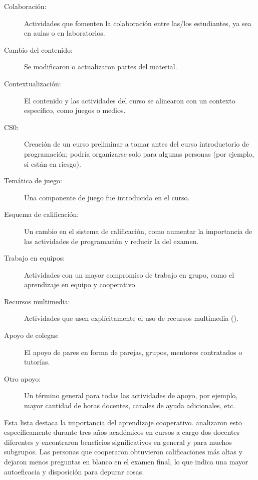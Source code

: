 \begin{description}

\item[Colaboración:]
  Actividades que fomenten la colaboración entre las/los estudiantes, ya sea en aulas o en laboratorios.

\item[Cambio del contenido:]
  Se modificaron o actualizaron partes del material.

\item[Contextualización:]
  El contenido y las actividades del curso se alinearon con un contexto específico, como juegos o medios.

\item[CS0:]
  Creación de un curso preliminar a tomar antes del curso introductorio de programación;
  podría organizarse solo para algunas personas (por ejemplo, si están en riesgo).

\item[Temática de juego:]
  Una componente de juego fue introducida en el curso.

\item[Esquema de calificación:]
  Un cambio en el sistema de calificación,
  como aumentar la importancia de las actividades de programación y reducir la del examen.

\item[Trabajo en equipos:]
  Actividades con un mayor compromiso de trabajo en grupo, como el aprendizaje en equipo y cooperativo.

\item[Recursos multimedia:]
  Actividades que usen explícitamente el uso de recursos multimedia ().

\item[Apoyo de colegas:]
  El apoyo de pares en forma de parejas, grupos, mentores contratados o tutorías.

\item[Otro apoyo:]
  Un término general para todas las actividades de apoyo,
  por ejemplo, mayor cantidad de horas docentes, canales de ayuda adicionales, etc.

\end{description}


Esta lista destaca la importancia del aprendizaje cooperativo.
\cite{Beck2013} analizaron esto específicamente durante tres años académicos en cursos a cargo dos docentes diferentes
y encontraron beneficios significativos en general y para muchos subgrupos.
Las personas que cooperaron obtuvieron calificaciones más altas
y dejaron menos preguntas en blanco en el examen final,
lo que indica una mayor autoeficacia y disposición para depurar cosas.

